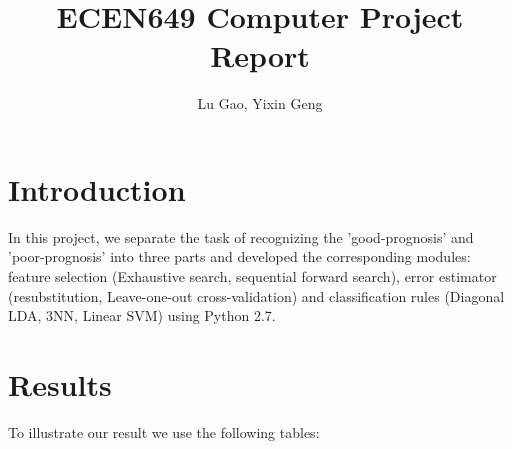 \documentclass[10pt]{article}
\author{Lu Gao, Yixin Geng}
\title{ECEN649 Computer Project Report}
\date{}
\begin{document}
	\maketitle
	\section{Introduction}
		In this project, we separate the task of recognizing the 'good-prognosis' and 'poor-prognosis' into three parts and developed the corresponding modules: feature selection (Exhaustive search, sequential forward search), error estimator (resubstitution, Leave-one-out cross-validation) and classification rules (Diagonal LDA, 3NN, Linear SVM) using Python 2.7.
	
	
	\section{Results}
		To illustrate our result we use the following tables:
\end{document}
